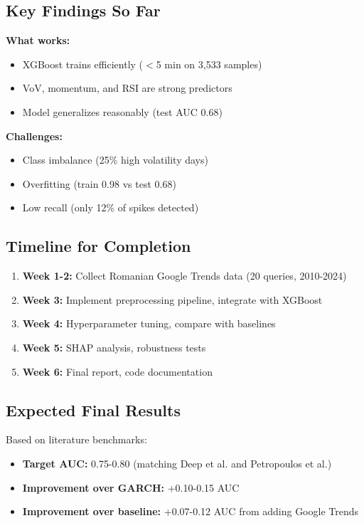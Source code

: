 \documentclass[12pt,a4paper]{article}
\begin{document}
\subsection{Key Findings So Far}

\textbf{What works:}
\begin{itemize}
    \item XGBoost trains efficiently ($<$5 min on 3,533 samples)
    \item VoV, momentum, and RSI are strong predictors
    \item Model generalizes reasonably (test AUC 0.68)
\end{itemize}

\textbf{Challenges:}
\begin{itemize}
    \item Class imbalance (25\% high volatility days)
    \item Overfitting (train 0.98 vs test 0.68)
    \item Low recall (only 12\% of spikes detected)
\end{itemize}

\subsection{Timeline for Completion}

\begin{enumerate}
    \item \textbf{Week 1-2:} Collect Romanian Google Trends data (20 queries, 2010-2024)
    \item \textbf{Week 3:} Implement preprocessing pipeline, integrate with XGBoost
    \item \textbf{Week 4:} Hyperparameter tuning, compare with baselines
    \item \textbf{Week 5:} SHAP analysis, robustness tests
    \item \textbf{Week 6:} Final report, code documentation
\end{enumerate}

\subsection{Expected Final Results}

Based on literature benchmarks:
\begin{itemize}
    \item \textbf{Target AUC:} 0.75-0.80 (matching Deep et al. and Petropoulos et al.)
    \item \textbf{Improvement over GARCH:} +0.10-0.15 AUC
    \item \textbf{Improvement over baseline:} +0.07-0.12 AUC from adding Google Trends
\end{itemize}
\end{document}
